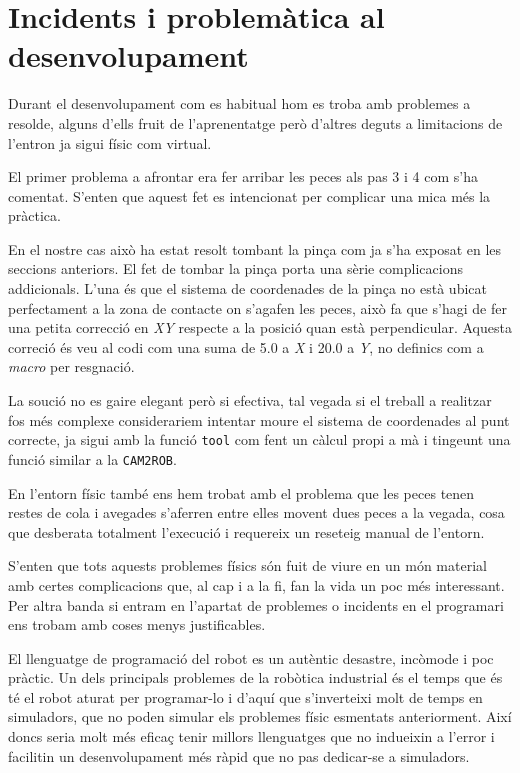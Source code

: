 \section{Incidents i problemàtica al desenvolupament}\label{incidents}

Durant el desenvolupament com es habitual hom es troba amb problemes a resolde,
alguns d'ells fruit de l'aprenentatge però d'altres deguts a limitacions
de l'entron ja sigui físic com virtual.

El primer problema a afrontar era fer arribar les peces als pas 3 i 4 com s'ha
comentat. S'enten que aquest fet es intencionat per complicar una mica
més la pràctica.

En el nostre cas això ha estat resolt tombant la pinça com ja s'ha exposat en
les seccions anteriors. El fet de tombar la pinça porta una sèrie complicacions 
addicionals. L'una és que el sistema de coordenades de la pinça no està
ubicat perfectament a la zona de contacte on s'agafen les peces, això fa que
s'hagi de fer una petita correcció en \emph{XY} respecte
a la posició quan està perpendicular. Aquesta correció és veu al codi com una
suma de 5.0 a \emph{X} i 20.0 a \emph{Y}, no definics com a \emph{macro}
per resgnació.

La so\lgem ució no es gaire elegant però si efectiva, tal vegada si el 
treball a realitzar fos més complexe considerariem intentar moure el sistema
de coordenades al punt correcte, ja sigui amb la funció \texttt{tool}
com fent un càlcul propi a mà i tingeunt una funció similar a la \texttt{CAM2ROB}.

En l'entorn físic també ens hem trobat amb el problema que les peces
tenen restes de cola i avegades s'aferren entre elles movent dues peces a la
vegada, cosa que desberata totalment l'execució i requereix un reseteig manual
de l'entorn.

S'enten que tots aquests problemes físics són fuit de viure en un món
material amb certes complicacions que, al cap i a la fi, fan la vida un poc més
interessant. Per altra banda si entram en l'apartat de problemes o incidents
en el programari ens trobam amb coses menys justificables.

El llenguatge de programació del robot es un autèntic desastre, incòmode i
poc pràctic. Un dels principals problemes de la robòtica 
industrial és el temps que és té el robot aturat per programar-lo i 
d'aquí que s'inverteixi molt de temps en simuladors, que no poden simular
els problemes físic esmentats anteriorment. Així doncs seria molt més
eficaç tenir millors llenguatges que no indueixin a l'error i facilitin
un desenvolupament més ràpid que no pas dedicar-se a simuladors.

